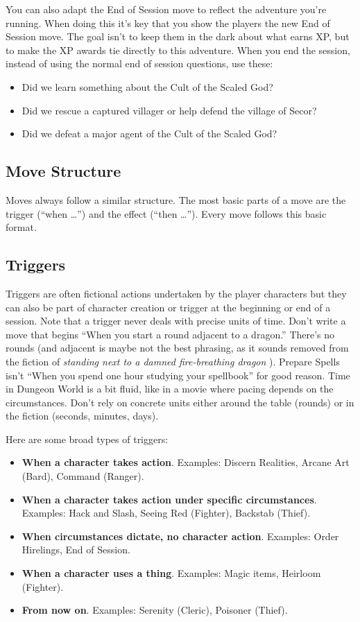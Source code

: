 You can also adapt the End of Session move to reflect the adventure you're running. When doing this it's key that you show the players the new End of Session move. The goal isn't to keep them in the dark about what earns XP, but to make the XP awards tie directly to this adventure.
\newpage
\HRule
When you end the session, instead of using the normal end of session questions, use these:
\begin{itemize}
\item Did we learn something about the Cult of the Scaled God?
\item Did we rescue a captured villager or help defend the village of Secor?
\item Did we defeat a major agent of the Cult of the Scaled God?
\end{itemize}
\HRule
\subsection{Move Structure}


Moves always follow a similar structure. The most basic parts of a move are the trigger (``when \ldots '') and the effect (``then \ldots ''). Every move follows this basic format.
\subsection{Triggers}


Triggers are often fictional actions undertaken by the player characters but they can also be part of character creation or trigger at the beginning or end of a session. Note that a trigger never deals with precise units of time. Don't write a move that begins ``When you start a round adjacent to a dragon.'' There's no rounds (and adjacent is maybe not the best phrasing, as it sounds removed from the fiction of \emph{standing next to a damned fire-breathing dragon}
). Prepare Spells isn't ``When you spend one hour studying your spellbook'' for good reason. Time in Dungeon World is a bit fluid, like in a movie where pacing depends on the circumstances. Don't rely on concrete units either around the table (rounds) or in the fiction (seconds, minutes, days).


Here are some broad types of triggers:
\begin{itemize}
\item \textbf{When a character takes action}. Examples: Discern Realities, Arcane Art (Bard), Command (Ranger).
\item \textbf{When a character takes action under specific circumstances}. Examples: Hack and Slash, Seeing Red (Fighter), Backstab (Thief).
\item \textbf{When circumstances dictate, no character action}. Examples: Order Hirelings, End of Session.
\item \textbf{When a character uses a thing}. Examples: Magic items, Heirloom (Fighter).
\item \textbf{From now on}. Examples: Serenity (Cleric), Poisoner (Thief).

\end{itemize}
